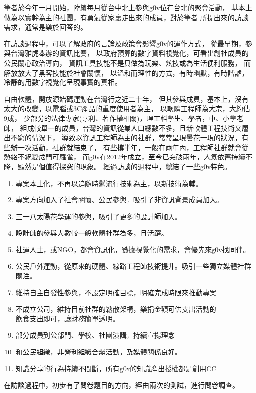 筆者於今年一月開始，陸續每月從台中北上參與g0v位在台北的聚會活動，
基本上做為以實幹為主的社團，有勇氣從家裏走出來的成員，對於筆者
所提出來的訪談需求，通常是樂於回答的。

在訪談過程中，可以了解政府的言論及政策會影響g0v的運作方式，
從最早期，參與台灣雅虎舉辦的資訊比賽，
以政府預算的數字資料視覺化，可看出創社成員的公民關心政治導向，
資訊工具技能不是只做為玩樂、炫技或為生活便利服務，
而解放放大了黑客技能於社會關懷，
以溫和而理性的方式，有時幽默，有時諧謔，冷靜的用數字視覺化呈現事實的真相。

自由軟體，開放源始碼運動在台灣行之近二十年，
但其參與成員，基本上，沒有太大的改變，以電腦或3C產品的重度使用者為主，
以軟體工程師為大宗，大約佔9成，
少部分的法律專家(專利、著作權相關)，理工科學生、學者，中、小學老師，
組成較單一的成員，台灣的資訊從業人口總數不多，且新軟體工程技術又層出不窮的情況下，
導致以資訊工程師為主的社群，常常呈現曇花一現的狀況，有些辦一次活動，社群就結束了，
有些撐半年，一般在兩年內，工程師社群就會從熱絡不絕變成門可羅雀，
而g0v在2012年成立，至今已突破兩年，人氣依舊持續不降，顯然是個值得探究的現象。
經過訪談的過程中，總結了一些g0v特色。

\begin{enumerate}
\item 專案本土化，不再以追隨時髦流行技術為主，以新技術為輔。
\item 專案方向加入了社會關懷、公民參與，吸引了非資訊背景成員加入。
\item 三一八太陽花學運的參與，吸引了更多的設計師加入。
\item 設計師的參與人數較一般軟體社群為多，且活躍。
\item 社運人士，或NGO，都會資訊化，數據視覺化的需求，會優先來g0v找同伴。
\item 公民戶外運動，從原來的硬體、線路工程師技術提升。吸引一些獨立媒體社群關注。
\item 維持自主自發性參與，不設定明確目標，明確完成時限來推動專案
\item 不成立公司，維持目前社群的鬆散架構，樂捐金額可供支出活動的 \\
       飲食支出即可，讓財務簡單透明。
\item 部分成員到公部門、學校、社團演講，持續宣揚理念
\item 和公民組織，非營利組織合辦活動，及媒體關係良好。
\item 知識分享的行為持續不間斷，所有g0v的知識產出授權都是創用CC
\end{enumerate}

在訪談過程中，初步有了問卷題目的方向，經由兩次的測試，進行問卷調查。





